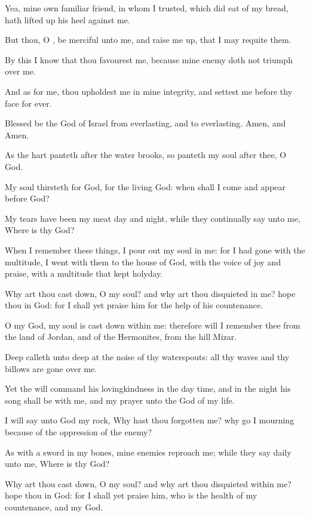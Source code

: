 \Verse Yea, mine own familiar friend, in whom I trusted, which did eat of my bread, hath lifted up his heel against me.

\Verse But thou, O \LORD, be merciful unto me, and raise me up, that I may requite them.

\Verse By this I know that thou favourest me, because mine enemy doth not triumph over me.

\Verse And as for me, thou upholdest me in mine integrity, and settest me before thy face for ever.

\Verse Blessed be the \LORD God of Israel from everlasting, and to everlasting. Amen, and Amen.




\Chapter
\Verse As the hart panteth after the water brooks, so panteth my soul after thee, O God.

\Verse My soul thirsteth for God, for the living God: when shall I come and appear before God?

\Verse My tears have been my meat day and night, while they continually say unto me, Where is thy God?

\Verse When I remember these things, I pour out my soul in me: for I had gone with the multitude, I went with them to the house of God, with the voice of joy and praise, with a multitude that kept holyday.

\Verse Why art thou cast down, O my soul? and why art thou disquieted in me?  hope thou in God: for I shall yet praise him for the help of his countenance.

\Verse O my God, my soul is cast down within me: therefore will I remember thee from the land of Jordan, and of the Hermonites, from the hill Mizar.

\Verse Deep calleth unto deep at the noise of thy waterspouts: all thy waves and thy billows are gone over me.

\Verse Yet the \LORD will command his lovingkindness in the day time, and in the night his song shall be with me, and my prayer unto the God of my life.

\Verse I will say unto God my rock, Why hast thou forgotten me? why go I mourning because of the oppression of the enemy?

\Verse As with a sword in my bones, mine enemies reproach me; while they say daily unto me, Where is thy God?

\Verse Why art thou cast down, O my soul? and why art thou disquieted within me? hope thou in God: for I shall yet praise him, who is the health of my countenance, and my God.




